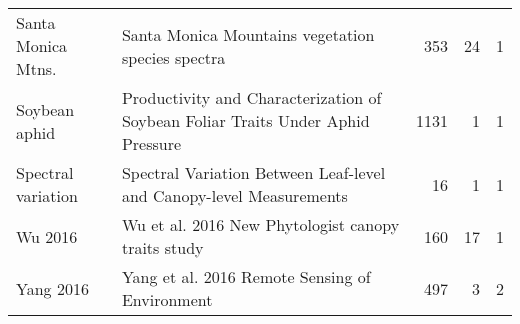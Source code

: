 \begin{table}[H]
\begin{tabular}{l>{\raggedright\arraybackslash}p{25em}rrr}
Santa Monica Mtns. & Santa Monica Mountains vegetation species spectra & 353 & 24 & 1\\
Soybean aphid & Productivity and Characterization of Soybean Foliar Traits Under Aphid Pressure & 1131 & 1 & 1\\
Spectral variation & Spectral Variation Between Leaf-level and Canopy-level Measurements & 16 & 1 & 1\\
\addlinespace
Wu 2016 & Wu et al. 2016 New Phytologist canopy traits study & 160 & 17 & 1\\
Yang 2016 & Yang et al. 2016 Remote Sensing of Environment & 497 & 3 & 2\\
\bottomrule
\end{tabular}\endgroup{}
\end{table}